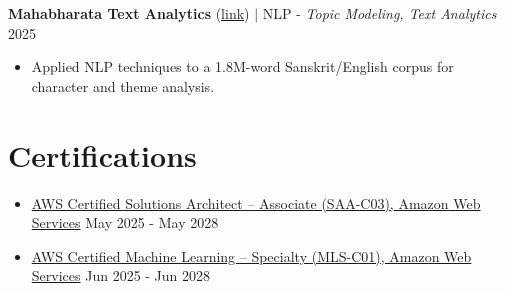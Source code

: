 \documentclass[letterpaper,11pt]{article}
\begin{document}
{%

{\textbf{Mahabharata Text Analytics} (\href{https://mahabharata.vishguru.com}{\underline{link}}) $|$ NLP - \emph{Topic Modeling, Text Analytics}} \hfill{2025}\vspace{-4pt}
\begin{itemize}[leftmargin=0.18in, itemsep=1px, parsep=0pt]
\item Applied NLP techniques to a 1.8M-word Sanskrit/English corpus for character and theme analysis.
\end{itemize}
}



\vspace{-15pt}
\section{Certifications}

\begin{itemize}[leftmargin=0.1in, itemsep=1px, parsep=0pt]

\item{
\href{\salink}{{AWS Certified Solutions Architect – Associate (SAA-C03), Amazon Web Services}} 
\hfill{May 2025 - May 2028}}

\vspace{-1pt}
\item{
\href{\mllink}{{AWS Certified Machine Learning – Specialty (MLS-C01), Amazon Web Services}} 
\hfill{Jun 2025 - Jun 2028}}


\end{itemize}
\vspace{-21pt}
\end{document}
